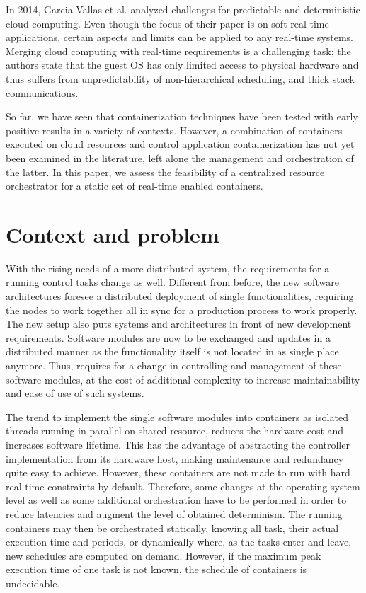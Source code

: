 \documentclass[]{scrartcl}
\begin{document}
In 2014, Garcia-Vallas et al. \cite{Garcia-Vallsetal2014} analyzed challenges for predictable and deterministic cloud computing.
Even though the focus of their paper is on soft real-time applications, certain aspects and limits can be applied to any real-time systems.
Merging cloud computing with real-time requirements is a challenging task; the authors state that the guest OS has only limited access to physical hardware and thus suffers from unpredictability of non-hierarchical scheduling, and thick stack communications. 

So far, we have seen that containerization techniques have been tested with early positive results in a variety of contexts.
However, a combination of containers executed on cloud resources and control application containerization has not yet been examined in the literature, left alone the management and orchestration of the latter. 
In this paper, we assess the feasibility of a centralized resource orchestrator for a static set of real-time enabled containers.


\section{Context and problem}
\label{sec:context}

With the rising needs of a more distributed system, the requirements for a running control tasks change as well.
Different from before, the new software architectures foresee a distributed deployment of single functionalities, requiring the nodes to work together all in sync for a production process to work properly. 
The new setup also puts systems and architectures in front of new development requirements. Software modules are now to be exchanged and updates in a distributed manner as the functionality itself is not located in as single place anymore. 
Thus, requires for a change in controlling and management of these software modules, at the cost of additional complexity to increase maintainability and ease of use of such systems.

The trend to implement the single software modules into containers as isolated threads running in parallel on shared resource, reduces the hardware cost and increases software lifetime. 
This has the advantage of abstracting the controller implementation from its hardware host, making maintenance and redundancy quite easy to achieve. %
However, these containers are not made to run with hard real-time constraints by default. Therefore, some changes at the operating system level as well as some additional orchestration have to be performed in order to reduce latencies and augment the level of obtained determinism.
The running containers may then be orchestrated statically, knowing all task, their actual execution time and periods, or dynamically where, as the tasks enter and leave, new schedules are computed on demand.
However, if the maximum peak execution time of one task is not known, the schedule of containers is undecidable. 
\end{document}
